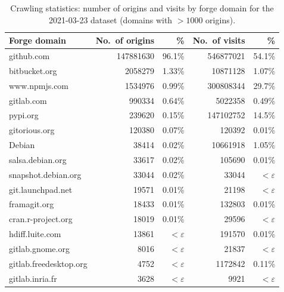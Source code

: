 \begin{table}
  \caption{Crawling statistics: number of origins and visits by forge domain
  for the 2021-03-23 dataset (domains with $>1000$ origins).}%
  \label{tab:visits-by-domain}
  \centering
  \begin{tabular}{l|rr|rr}
    \textbf{Forge domain}
    & \textbf{No.~of origins} & \textbf{\%}
    & \textbf{No.~of visits} & \textbf{\%} \\
    \hline
        github.com                & \num{147881630} & 96.1\%      & \num{546877021}  & 54.1\% \\
        bitbucket.org             & \num{2058279}   & 1.33\%      & \num{10871128}   & 1.07\% \\
        www.npmjs.com             & \num{1534976}   & 0.99\%      & \num{300808344}  & 29.7\% \\
        gitlab.com                & \num{990334}    & 0.64\%      & \num{5022358}    & 0.49\% \\
        pypi.org                  & \num{239620}    & 0.15\%      & \num{147102752}  & 14.5\% \\
        gitorious.org             & \num{120380}    & 0.07\%      & \num{120392}     & 0.01\% \\
        Debian                    & \num{38414}     & 0.02\%      & \num{10661918}   & 1.05\% \\
        salsa.debian.org          & \num{33617}     & 0.02\%      & \num{105690}     & 0.01\% \\
        snapshot.debian.org       & \num{33044}     & 0.02\%      & \num{33044}      & $<\varepsilon$ \\
        git.launchpad.net         & \num{19571}     & 0.01\%      & \num{21198}      & $<\varepsilon$ \\
        framagit.org              & \num{18433}     & 0.01\%      & \num{132803}     & 0.01\% \\
        cran.r-project.org        & \num{18019}     & 0.01\%      & \num{29596}      & $<\varepsilon$ \\
        hdiff.luite.com           & \num{13861}     & $<\varepsilon$ & \num{191570}     & 0.01\% \\
        gitlab.gnome.org          & \num{8016}      & $<\varepsilon$ & \num{21837}      & $<\varepsilon$ \\
        gitlab.freedesktop.org    & \num{4752}      & $<\varepsilon$ & \num{1172842}    & 0.11\% \\
        gitlab.inria.fr           & \num{3628}      & $<\varepsilon$ & \num{9921}       & $<\varepsilon$ \\

\end{tabular}
\end{table}
